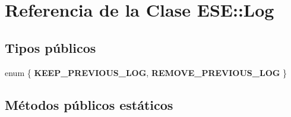 \hypertarget{class_e_s_e_1_1_log}{\section{Referencia de la Clase E\-S\-E\-:\-:Log}
\label{class_e_s_e_1_1_log}
}
\subsection*{Tipos públicos}
\begin{DoxyCompactItemize}
\item 
enum \{ {\bfseries K\-E\-E\-P\-\_\-\-P\-R\-E\-V\-I\-O\-U\-S\-\_\-\-L\-O\-G}, 
{\bfseries R\-E\-M\-O\-V\-E\-\_\-\-P\-R\-E\-V\-I\-O\-U\-S\-\_\-\-L\-O\-G}
 \}
\end{DoxyCompactItemize}
\subsection*{Métodos públicos estáticos}
